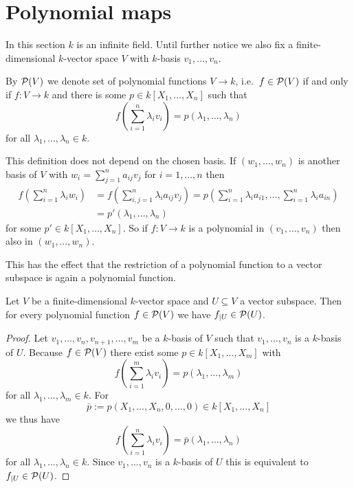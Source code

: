 




\section{Polynomial maps}


In this section $k$ is an infinite field. Until further notice we also fix a finite-dimensional $k$-vector space $V$ with $k$-basis $v_1, \dotsc, v_n$.


\begin{defi}
 By $\mathcal{P}(V)$ we denote set of polynomial functions $V \to k$, i.e.\ $f \in \mathcal{P}(V)$ if and only if $f \colon V \to k$ and there is some $p \in k[X_1, \dotsc, X_n]$ such that
 \[
  f\left( \sum_{i=1}^n \lambda_i v_i \right) = p(\lambda_1, \dotsc, \lambda_n)
 \]
 for all $\lambda_1, \dotsc, \lambda_n \in k$.
\end{defi}


This definition does not depend on the chosen basis. If $(w_1, \dotsc, w_n)$ is another basis of $V$ with $w_i = \sum_{j=1}^n a_{ij} v_j$ for $i=1,\dotsc,n$ then
\begin{align*}
 f\left( \sum_{i=1}^n \lambda_i w_i \right)
 &= f\left( \sum_{i,j=1}^n \lambda_i a_{ij} v_j \right)
 = p\left( \sum_{i=1}^n \lambda_i a_{i1}, \dotsc, \sum_{i=1}^n \lambda_{i} a_{in} \right)\\
 &= p'(\lambda_1, \dotsc, \lambda_n)
\end{align*}
for some $p' \in k[X_1, \dotsc, X_n]$. So if $f \colon V \to k$ is a polynomial in $(v_1, \dotsc, v_n)$ then also in $(w_1, \dotsc, w_n)$.

This has the effect that the restriction of a polynomial function to a vector subspace is again a polynomial function.

\begin{lem}
 Let $V$ be a finite-dimensional $k$-vector space and $U \subseteq V$ a vector subspace. Then for every polynomial function $f \in \mathcal{P}(V)$ we have $f_{|U} \in \mathcal{P}(U)$.
\end{lem}
\begin{proof}
 Let $v_1, \dotsc, v_n, v_{n+1}, \dotsc, v_m$ be a $k$-basis of $V$ such that $v_1, \dotsc, v_n$ is a $k$-basis of $U$. Because $f \in \mathcal{P}(V)$ there exist some $p \in k[X_1, \dotsc, X_m]$ with
 \[
  f\left( \sum_{i=1}^m \lambda_i v_i \right) = p(\lambda_1, \dotsc, \lambda_m)
 \]
 for all $\lambda_1, \dotsc, \lambda_m \in k$. For
 \[
  \bar{p} := p(X_1, \dotsc, X_n, 0, \dotsc, 0) \in k[X_1, \dotsc, X_n]
 \]
 we thus have
 \[
  f\left( \sum_{i=1}^n \lambda_i v_i \right) = \bar{p}(\lambda_1, \dotsc, \lambda_n)
 \]
 for all $\lambda_1, \dotsc, \lambda_n \in k$. Since $v_1, \dotsc, v_n$ is a $k$-basis of $U$ this is equivalent to $f_{|U} \in \mathcal{P}(U)$.
\end{proof}


